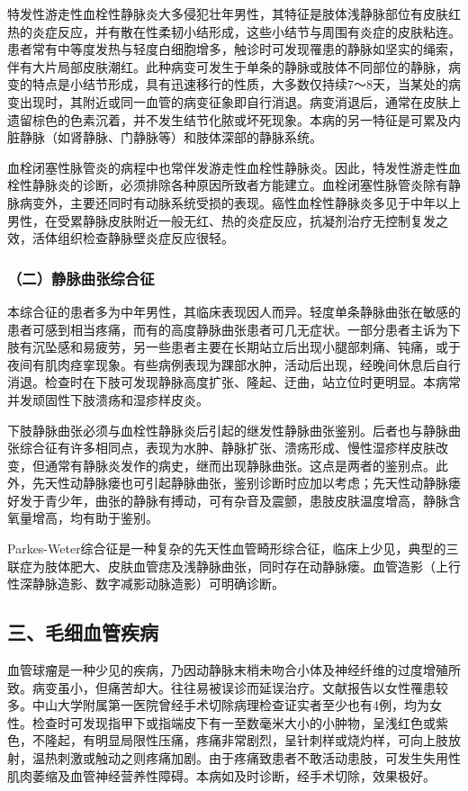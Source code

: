 特发性游走性血栓性静脉炎大多侵犯壮年男性，其特征是肢体浅静脉部位有皮肤红热的炎症反应，并有散在性柔韧小结形成，这些小结节与周围有炎症的皮肤粘连。患者常有中等度发热与轻度白细胞增多，触诊时可发现罹患的静脉如坚实的绳索，伴有大片局部皮肤潮红。此种病变可发生于单条的静脉或肢体不同部位的静脉，病变的特点是小结节形成，具有迅速移行的性质，大多数仅持续7～8天，当某处的病变出现时，其附近或同一血管的病变征象即自行消退。病变消退后，通常在皮肤上遗留棕色的色素沉着，并不发生结节化脓或坏死现象。本病的另一特征是可累及内脏静脉（如肾静脉、门静脉等）和肢体深部的静脉系统。

血栓闭塞性脉管炎的病程中也常伴发游走性血栓性静脉炎。因此，特发性游走性血栓性静脉炎的诊断，必须排除各种原因所致者方能建立。血栓闭塞性脉管炎除有静脉病变外，主要还同时有动脉系统受损的表现。癌性血栓性静脉炎多见于中年以上男性，在受累静脉皮肤附近一般无红、热的炎症反应，抗凝剂治疗无控制复发之效，活体组织检查静脉壁炎症反应很轻。

\subsubsection{（二）静脉曲张综合征}

本综合征的患者多为中年男性，其临床表现因人而异。轻度单条静脉曲张在敏感的患者可感到相当疼痛，而有的高度静脉曲张患者可几无症状。一部分患者主诉为下肢有沉坠感和易疲劳，另一些患者主要在长期站立后出现小腿部刺痛、钝痛，或于夜间有肌肉痉挛现象。有些病例表现为踝部水肿，活动后出现，经晚间休息后自行消退。检查时在下肢可发现静脉高度扩张、隆起、迂曲，站立位时更明显。本病常并发顽固性下肢溃疡和湿疹样皮炎。

下肢静脉曲张必须与血栓性静脉炎后引起的继发性静脉曲张鉴别。后者也与静脉曲张综合征有许多相同点，表现为水肿、静脉扩张、溃疡形成、慢性湿疹样皮肤改变，但通常有静脉炎发作的病史，继而出现静脉曲张。这点是两者的鉴别点。此外，先天性动静脉瘘也可引起静脉曲张，鉴别诊断时应加以考虑；先天性动静脉瘘好发于青少年，曲张的静脉有搏动，可有杂音及震颤，患肢皮肤温度增高，静脉含氧量增高，均有助于鉴别。

Parkes-Weter综合征是一种复杂的先天性血管畸形综合征，临床上少见，典型的三联症为肢体肥大、皮肤血管痣及浅静脉曲张，同时存在动静脉瘘。血管造影（上行性深静脉造影、数字减影动脉造影）可明确诊断。

\subsection{三、毛细血管疾病}

血管球瘤是一种少见的疾病，乃因动静脉末梢未吻合小体及神经纤维的过度增殖所致。病变虽小，但痛苦却大。往往易被误诊而延误治疗。文献报告以女性罹患较多。中山大学附属第一医院曾经手术切除病理检查证实者至少也有4例，均为女性。检查时可发现指甲下或指端皮下有一至数毫米大小的小肿物，呈浅红色或紫色，不隆起，有明显局限性压痛，疼痛非常剧烈，呈针刺样或烧灼样，可向上肢放射，温热刺激或触动之则疼痛加剧。由于疼痛致患者不敢活动患肢，可发生失用性肌肉萎缩及血管神经营养性障碍。本病如及时诊断，经手术切除，效果极好。

